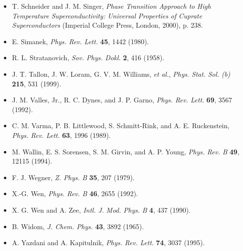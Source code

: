 \begin{itemize}[leftmargin=2em,itemsep=0pt,parsep=0pt,label={}]
\item [SS2000] T. Schneider and J. M. Singer, \emph{Phase Transition Approach to High Temperature Superconductivity: Universal Properties of Cuprate Superconductors} (Imperial College Press, London, 2000), p. 238.
\item [S1980] E. Simanek, \emph{Phys. Rev. Lett.} \textbf{45}, 1442 (1980).
\item [S1958] R. L. Stratanovich, \emph{Sov. Phys. Dokl.} \textbf{2}, 416 (1958).
\item [T1999] J. T. Tallon, J. W. Loram, G. V. M. Williams, \emph{et al.}, \emph{Phys. Stat. Sol. (b)} \textbf{215}, 531 (1999).
\item [V1992] J. M. Valles, Jr., R. C. Dynes, and J. P. Garno, \emph{Phys. Rev. Lett.} \textbf{69}, 3567 (1992).
\item [V1989] C. M. Varma, P. B. Littlewood, S. Schmitt-Rink, and A. E. Ruckenstein, \emph{Phys. Rev. Lett.} \textbf{63}, 1996 (1989).
\item [W1994] M. Wallin, E. S. Sorensen, S. M. Girvin, and A. P. Young, \emph{Phys. Rev. B} \textbf{49}, 12115 (1994).
\item [W1979] F. J. Wegner, \emph{Z. Phys. B} \textbf{35}, 207 (1979).
\item [W1992] X.-G. Wen, \emph{Phys. Rev. B} \textbf{46}, 2655 (1992).
\item [WZ1990] X. G. Wen and A. Zee, \emph{Intl. J. Mod. Phys. B} \textbf{4}, 437 (1990).
\item [W1965] B. Widom, \emph{J. Chem. Phys.} \textbf{43}, 3892 (1965).
\item [YK1995] A. Yazdani and A. Kapitulnik, \emph{Phys. Rev. Lett.} \textbf{74}, 3037 (1995).
\end{itemize}

